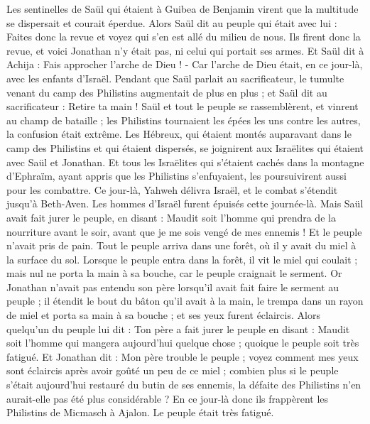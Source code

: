 \begin{multicols}{2}
Les sentinelles de Saül qui étaient à Guibea de Benjamin virent que la multitude se dispersait et courait éperdue.
Alors Saül dit au peuple qui était avec lui : Faites donc la revue et voyez qui s’en est allé du milieu de nous. Ils firent donc la revue, et voici Jonathan n'y était pas, ni celui qui portait ses armes.
Et Saül dit à Achija : Fais approcher l'arche de Dieu ! - Car l'arche de Dieu était, en ce jour-là, avec les enfants d'Israël.
Pendant que Saül parlait au sacrificateur, le tumulte venant du camp des Philistins augmentait de plus en plus ; et Saül dit au sacrificateur : Retire ta main !
Saül et tout le peuple se rassemblèrent, et vinrent au champ de bataille ; les Philistins tournaient les épées les uns contre les autres, la confusion était extrême.
Les Hébreux, qui étaient montés auparavant dans le camp des Philistins et qui étaient dispersés, se joignirent aux Israëlites qui étaient avec Saül et Jonathan.
Et tous les Israëlites qui s'étaient cachés dans la montagne d'Ephraïm, ayant appris que les Philistins s'enfuyaient, les poursuivirent aussi pour les combattre.
Ce jour-là, Yahweh délivra Israël, et le combat s’étendit jusqu'à Beth-Aven.
Les hommes d'Israël furent épuisés cette journée-là. Mais Saül avait fait jurer le peuple, en disant : Maudit soit l'homme qui prendra de la nourriture avant le soir, avant que je me sois vengé de mes ennemis ! Et le peuple n’avait pris de pain.
Tout le peuple arriva dans une forêt, où il y avait du miel à la surface du sol.
Lorsque le peuple entra dans la forêt, il vit le miel qui coulait ; mais nul ne porta la main à sa bouche, car le peuple craignait le serment.
Or Jonathan n'avait pas entendu son père lorsqu'il avait fait faire le serment au peuple ; il étendit le bout du bâton qu'il avait à la main, le trempa dans un rayon de miel et porta sa main à sa bouche ; et ses yeux furent éclaircis.
Alors quelqu'un du peuple lui dit : Ton père a fait jurer le peuple en disant : Maudit soit l'homme qui mangera aujourd'hui quelque chose ; quoique le peuple soit très fatigué.
Et Jonathan dit : Mon père trouble le peuple ; voyez comment mes yeux sont éclaircis après avoir goûté un peu de ce miel ;
combien plus si le peuple s’était aujourd'hui restauré du butin de ses ennemis, la défaite des Philistins n'en aurait-elle pas été plus considérable ?
En ce jour-là donc ils frappèrent les Philistins de Micmasch à Ajalon. Le peuple était très fatigué.

\end{multicols}
